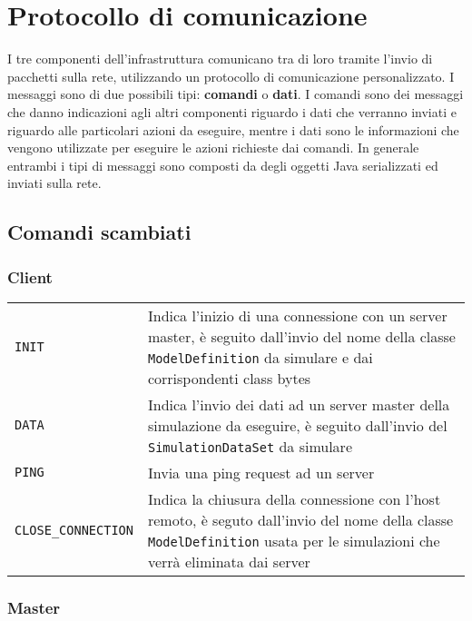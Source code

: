 
\section{Protocollo di comunicazione}

I tre componenti dell'infrastruttura comunicano tra di loro tramite l'invio di pacchetti sulla rete, utilizzando un protocollo di comunicazione personalizzato. 
I messaggi sono di due possibili tipi: \textbf{comandi} o \textbf{dati}. I comandi sono dei messaggi che danno indicazioni agli altri componenti riguardo i dati che verranno inviati e riguardo alle particolari azioni da eseguire, mentre i dati sono le informazioni che vengono utilizzate per eseguire le azioni richieste dai comandi. In generale entrambi i tipi di messaggi sono composti da degli oggetti Java serializzati ed inviati sulla rete.

\subsection{Comandi scambiati}

\subsubsection{Client}

\begin{table}[H]
    \begin{tabularx}{\linewidth}{ l X }
       \texttt{INIT}             & Indica l'inizio di una connessione con un server master, è seguito dall'invio del nome della classe \texttt{ModelDefinition} da simulare e dai corrispondenti class bytes \\
       \texttt{DATA}             & Indica l'invio dei dati ad un server master della simulazione da eseguire, è seguito dall'invio del \texttt{SimulationDataSet} da simulare \\
       \texttt{PING}             & Invia una ping request ad un server \\
       \texttt{CLOSE\_CONNECTION} & Indica la chiusura della connessione con l'host remoto, è seguto dall'invio del nome della classe \texttt{ModelDefinition} usata per le simulazioni che verrà eliminata dai server
    \end{tabularx}
\end{table}

\subsubsection{Master}

